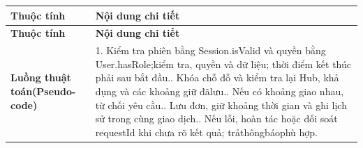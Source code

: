 \begin{longtable}{|L{0.24\textwidth}|L{0.70\textwidth}|}
\hline
\textbf{Thuộc tính} & \textbf{Nội dung chi tiết} \\
\hline
\endfirsthead
\hline
\textbf{Thuộc tính} & \textbf{Nội dung chi tiết} \\
\hline
\endhead
\textbf{Luồng thuật toán}\newline \textbf{(Pseudo-code)} & 1. Kiểm tra phiên bằng Session.isValid và quyền bằng User.hasRole;\newline kiểm tra, quyền và dữ liệu; thời điểm kết thúc phải sau bắt đầu.. Khóa chỗ đỗ và kiểm tra lại Hub, khả dụng và các khoảng giữ đã\newline lưu.. Nếu có khoảng giao nhau, từ chối yêu cầu.. Lưu đơn, giữ khoảng thời gian và ghi lịch sử trong cùng giao dịch.. Nếu lỗi, hoàn tác hoặc đối soát requestId khi chưa rõ kết quả; trả\newline thôngbáophù hợp. \\
\hline
\end{longtable}
\vspace{-0.5\baselineskip}
